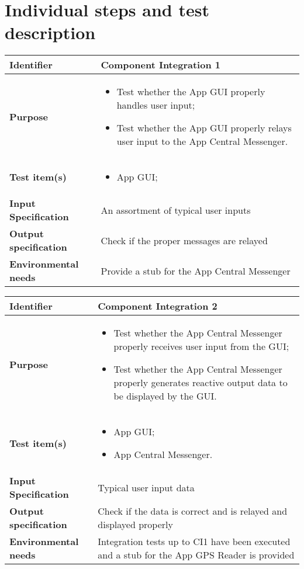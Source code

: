 \chapter{Individual steps and test description}


\begin{center}
\begin{tabular}{lp{}}
\toprule
\textbf{Identifier}		&	Component Integration 1\\
\midrule
\textbf{Purpose}		&	\begin{itemize}
					\item Test whether the App GUI properly handles user input;
					\item Test whether the App GUI properly relays user input to the App Central Messenger.
					\end{itemize}	\\
\textbf{Test item(s)}	&	\begin{itemize}
					\item App GUI;
					\end{itemize}	\\
\textbf{Input Specification}	&	An assortment of typical user inputs\\
\textbf{Output specification}	&	Check if the proper messages are relayed\\
\textbf{Environmental needs}	&	Provide a stub for the App Central Messenger\\
\bottomrule
\end{tabular}
\end{center}


\begin{center}
\begin{tabular}{lp{}}
\toprule
\textbf{Identifier}		&	Component Integration 2\\
\midrule
\textbf{Purpose}		&	\begin{itemize}
					\item Test whether the App Central Messenger properly receives user input from the GUI;
					\item Test whether the App Central Messenger properly generates reactive output data to be displayed by the GUI.
					\end{itemize}	\\
\textbf{Test item(s)}	&	\begin{itemize}
					\item App GUI;
					\item App Central Messenger.
					\end{itemize}	\\
\textbf{Input Specification}	&	Typical user input data\\
\textbf{Output specification}	&	Check if the data is correct and is relayed and displayed properly\\
\textbf{Environmental needs}	&	Integration tests up to CI1 have been executed and a stub for the App GPS Reader is provided\\
\bottomrule
\end{tabular}
\end{center}

